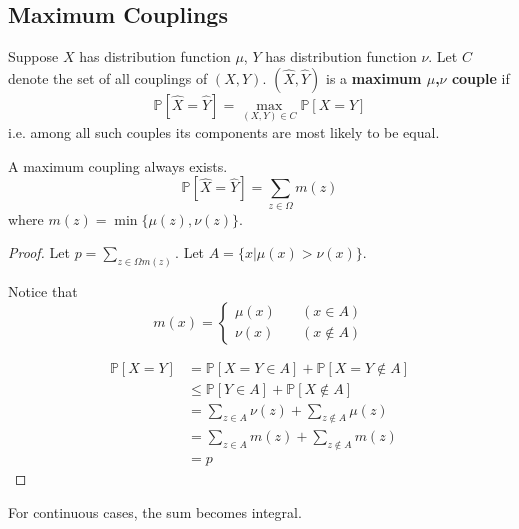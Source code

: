     \subsection{Maximum Couplings}
        \begin{definition}
            Suppose $X$ has distribution function $\mu$, $Y$ has distribution function $\nu$. Let $C$ denote the set of all couplings of $(X,Y)$. $(\hat{X},\hat{Y})$ is a \textbf{maximum $\mu$,$\nu$ couple} if
            \[ \mathbb{P}[\hat{X}=\hat{Y}] = \max_{(X,Y)\in C}\mathbb{P}[X=Y] \]
            i.e. among all such couples its components are most likely to be equal.
        \end{definition}
        \begin{proposition}
            A maximum coupling always exists.
            \[ \mathbb{P}[\hat{X} = \hat{Y}] = \sum_{z\in\Omega}m(z) \]
            where $m(z) = \min\{ \mu(z), \nu(z) \}$.
        \end{proposition}
        \begin{proof}
            Let $p = \sum_{z\in\Omega m(z)}$. Let $A = \{x| \mu(x) > \nu(x)\}$.
            
            Notice that
            \[ m(x) = 
                \begin{cases}
                    \mu(x) \quad &(x \in A)\\
                    \nu(x) \quad &(x \notin A)
                \end{cases}
            \]
            
            \begin{align*}
                \mathbb{P}[X=Y] &= \mathbb{P}[X=Y\in A] + \mathbb{P}[X = Y \notin A]\\
                &\le \mathbb{P}[Y \in A] + \mathbb{P}[X \notin A]\\
                &= \sum_{z\in A}\nu(z) + \sum_{z\notin A}\mu(z)\\
                &= \sum_{z\in A}m(z) + \sum_{z \notin A}m(z)\\
                &= p
            \end{align*}
        \end{proof}
        \begin{remark}
            For continuous cases, the sum becomes integral.
        \end{remark}

